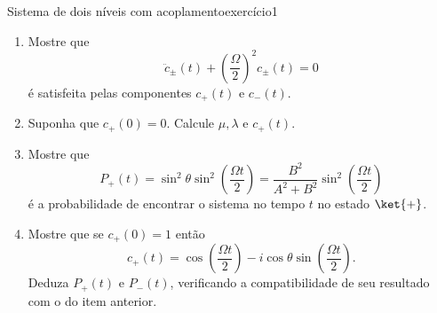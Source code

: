 \begin{exercício}{Sistema de dois níveis com acoplamento}{exercício1}
\begin{enumerate}[label=(\alph*)]
            onde \(\hbar \Omega\) é a diferença entre os dois níveis de energia.
        \item Mostre que
            \begin{equation*}
                \ddot{c}_\pm(t) + \left(\frac{\Omega}{2}\right)^2 c_{\pm}(t) = 0
            \end{equation*}
            é satisfeita pelas componentes \(c_+(t)\) e \(c_-(t)\).
        \item Suponha que \(c_+(0) = 0\). Calcule \(\mu, \lambda\) e \(c_+(t)\).
        \item Mostre que
            \begin{equation*}
                P_+(t) = \sin^2\theta \sin^2\left(\frac{\Omega t}{2}\right) = \frac{B^2}{A^2 + B^2}\sin^2\left(\frac{\Omega t}{2}\right)
            \end{equation*}
            é a probabilidade de encontrar o sistema no tempo \(t\) no estado \(\ket{+}\).
        \item Mostre que se \(c_+(0) = 1\) então
            \begin{equation*}
                c_+(t) = \cos\left(\frac{\Omega t}{2}\right) - i \cos\theta \sin\left(\frac{\Omega t}{2}\right).
            \end{equation*}
            Deduza \(P_+(t)\) e \(P_-(t)\), verificando a compatibilidade de seu resultado com o do item anterior.
    \end{enumerate}
\end{exercício}
